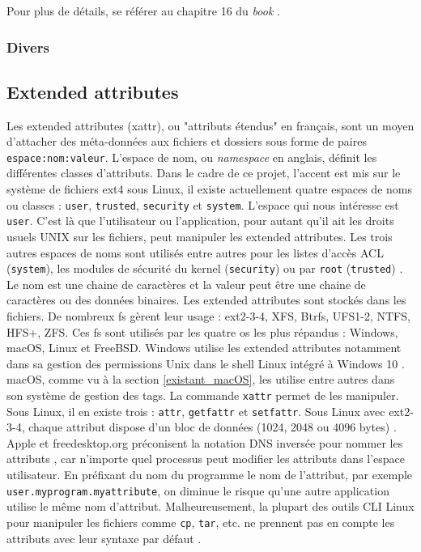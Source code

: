 \documentclass[a4paper, 12pt]{article}
\begin{document}
Pour plus de détails, se référer au chapitre 16 du \textit{book} \cite{ref0}.

\subsubsection{Divers}


\subsection{Extended attributes}\label{extended_attributes}
Les extended attributes (\acrshort{xattr}), ou "attributs étendus" en français, sont un moyen d'attacher des 
méta-données aux fichiers et dossiers sous forme de paires \texttt{espace:nom:valeur}. 
L'espace de nom, ou \textit{namespace} en anglais, définit les différentes classes d'attributs. 
Dans le cadre de ce projet, l'accent est mis sur le système de fichiers ext4 \cite{ref36}
sous Linux, il existe actuellement quatre espaces de noms 
ou classes : \texttt{user}, \texttt{trusted}, \texttt{security} et 
\texttt{system}. L'espace qui nous intéresse est \texttt{user}. C'est là que 
l'utilisateur ou l'application, pour autant qu'il ait les droits usuels UNIX sur les fichiers, peut 
manipuler les extended attributes. Les trois autres espaces de noms sont utilisés entre autres pour 
les listes d'accès ACL (\texttt{system}), les modules de sécurité du kernel 
(\texttt{security}) ou par \texttt{root} (\texttt{trusted})
\cite{ref11} \cite{ref12}.
Le nom est une chaine de caractères et la valeur peut être une chaine de caractères ou des données binaires. 
Les extended attributes sont stockés dans les fichiers. De nombreux \acrshort{fs} gèrent leur 
usage : ext2-3-4, XFS, Btrfs, UFS1-2, NTFS, HFS+, ZFS. Ces \acrshort{fs} sont utilisés par 
les quatre \acrshort{os} les plus répandus : Windows, macOS, Linux et FreeBSD. Windows utilise 
les extended attributes notamment dans sa gestion des permissions Unix dans le shell Linux intégré 
à Windows 10 \cite{ref21}. macOS, comme vu à la section \ref{existant_macOS}, les utilise entre 
autres dans son système de gestion des tags. La commande \texttt{xattr} permet de les 
manipuler. Sous Linux, il en existe trois : \texttt{attr}, \texttt{getfattr} et 
\texttt{setfattr}. Sous Linux avec ext2-3-4, chaque attribut dispose d'un bloc de données 
(1024, 2048 ou 4096 bytes) \cite{ref12}.
Apple et freedesktop.org préconisent la notation DNS inversée pour 
nommer les attributs \cite{ref8}, \cite{ref24} car n'importe quel processus peut modifier les 
attributs dans l'espace utilisateur. En préfixant du nom du programme le nom de l'attribut, par 
exemple \texttt{user.myprogram.myattribute}, on diminue le risque qu'une autre 
application utilise le même nom d'attribut. Malheureusement, la plupart des outils CLI Linux 
pour manipuler les fichiers comme \texttt{cp}, \texttt{tar}, etc. ne prennent 
pas en compte les attributs avec leur syntaxe par défaut \cite{ref4}.
\end{document}

